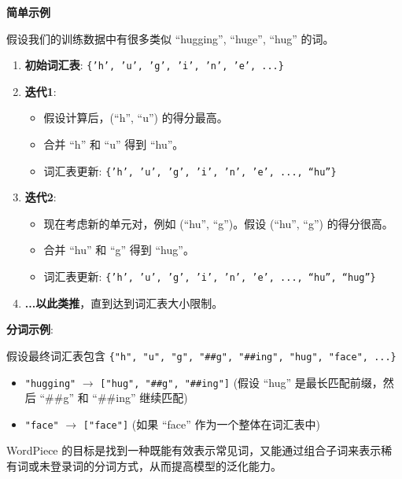 \documentclass[12pt,letterpaper]{article}
\begin{document}
\vspace{\baselineskip} %
\noindent\textbf{简单示例}

\noindent 假设我们的训练数据中有很多类似 ``hugging'', ``huge'', ``hug'' 的词。
\begin{enumerate}
    \item \textbf{初始词汇表}: \texttt{\{'h', 'u', 'g', 'i', 'n', 'e', ...\}}

    \item \textbf{迭代1}:
    \begin{itemize}
        \item 假设计算后，(``h'', ``u'') 的得分最高。
        \item 合并 ``h'' 和 ``u'' 得到 ``hu''。
        \item 词汇表更新: \texttt{\{'h', 'u', 'g', 'i', 'n', 'e', ..., ``hu''\}}
    \end{itemize}

    \item \textbf{迭代2}:
    \begin{itemize}
        \item 现在考虑新的单元对，例如 (``hu'', ``g'')。假设 (``hu'', ``g'') 的得分很高。
        \item 合并 ``hu'' 和 ``g'' 得到 ``hug''。
        \item 词汇表更新: \texttt{\{'h', 'u', 'g', 'i', 'n', 'e', ..., ``hu'', ``hug''\}}
    \end{itemize}

    \item \textbf{...以此类推}，直到达到词汇表大小限制。
\end{enumerate}

\noindent\textbf{分词示例}:

\noindent 假设最终词汇表包含 \texttt{\{"h", "u", "g", "\#\#g", "\#\#ing", "hug", "face", ...\}}
\begin{itemize}
    \item \texttt{"hugging"} $\rightarrow$ \texttt{["hug", "\#\#g", "\#\#ing"]} (假设 ``hug'' 是最长匹配前缀，然后 ``\#\#g'' 和 ``\#\#ing'' 继续匹配)
    \item \texttt{"face"} $\rightarrow$ \texttt{["face"]} (如果 ``face'' 作为一个整体在词汇表中)
\end{itemize}

WordPiece 的目标是找到一种既能有效表示常见词，又能通过组合子词来表示稀有词或未登录词的分词方式，从而提高模型的泛化能力。
\end{document}
